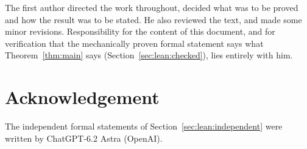\documentclass[11pt]{article}
\theoremstyle{definition}
\theoremstyle{remark}
\begin{document}
The first author directed the work throughout, decided what was to be proved and how the result
was to be stated. He also reviewed the text, and made some minor revisions.
Responsibility for the content of this document, and for verification that the mechanically proven formal statement says what Theorem~\ref{thm:main} says (Section~\ref{sec:lean:checked}), lies entirely with him.

\section*{Acknowledgement}

The independent formal statements of Section~\ref{sec:lean:independent} were written by
ChatGPT-6.2 Astra (OpenAI).
\end{document}
